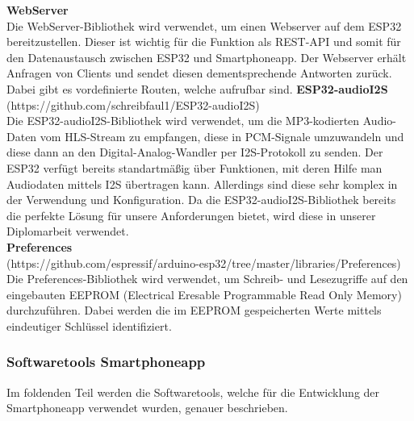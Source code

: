 \documentclass[]{article}
\begin{document}
\vspace{4mm}\newline
\textbf{WebServer} \\
Die WebServer-Bibliothek wird verwendet, um einen Webserver auf dem ESP32 bereitzustellen. Dieser ist wichtig für die Funktion als REST-API und somit für den Datenaustausch zwischen ESP32 und Smartphoneapp. Der Webserver erhält Anfragen von Clients und sendet diesen dementsprechende Antworten zurück. Dabei gibt es vordefinierte Routen, welche aufrufbar sind.
\vspace{4mm}\newline
\textbf{ESP32-audioI2S} \\
(https://github.com/schreibfaul1/ESP32-audioI2S) \\
Die ESP32-audioI2S-Bibliothek wird verwendet, um die MP3-kodierten Audio-Daten vom HLS-Stream zu empfangen, diese in PCM-Signale umzuwandeln und diese dann an den Digital-Analog-Wandler per I2S-Protokoll zu senden. Der ESP32 verfügt bereits standartmäßig über Funktionen, mit deren Hilfe man Audiodaten mittels I2S übertragen kann. Allerdings sind diese sehr komplex in der Verwendung und Konfiguration. Da die ESP32-audioI2S-Bibliothek bereits die perfekte Lösung für unsere Anforderungen bietet, wird diese in unserer Diplomarbeit verwendet. \newline \\
\textbf{Preferences} \\
(https://github.com/espressif/arduino-esp32/tree/master/libraries/Preferences)
Die Preferences-Bibliothek wird verwendet, um Schreib- und Lesezugriffe auf den eingebauten EEPROM (Electrical Eresable Programmable Read Only Memory) durchzuführen. Dabei werden die im EEPROM gespeicherten Werte mittels eindeutiger Schlüssel identifiziert.
\subsubsection{Softwaretools Smartphoneapp}
Im foldenden Teil werden die Softwaretools, welche für die Entwicklung der Smartphoneapp verwendet wurden, genauer beschrieben. \\
\end{document}
